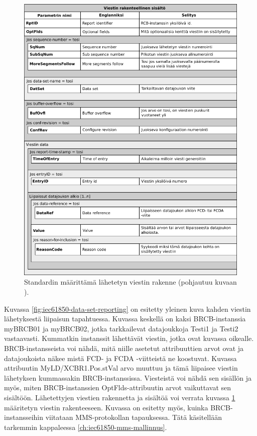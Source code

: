 \begin{figure}[ht!]
	\includegraphics[width=1\textwidth]{pictures/iec61850-report-format.png}
	\caption{Standardin määrittämä lähetetyn viestin rakenne (pohjautuu kuvaan \mbox{\cite[s.~104]{IEC61850-7-2}}).}
	\label{fig:iec61850-report-format}
\end{figure}

Kuvassa \ref{fig:iec61850-data-set-reporting} on esitetty yleinen kuva kahden viestin lähetyksestä liipaisun tapahtuessa. Kuvassa keskellä on kaksi BRCB-instanssia myBRCB01 ja myBRCB02, jotka tarkkailevat datajoukkoja Testi1 ja Testi2 vastaavasti. Kummatkin instanssit lähettävät viestin, jotka ovat kuvassa oikealle. BRCB-instansseista voi nähdä, mitä niille asetetut attribuuttien arvot ovat ja datajoukoista näkee mistä FCD- ja FCDA -viitteistä ne koostuvat. Kuvassa attribuutin MyLD/XCBR1.Pos.stVal arvo muuttuu ja tämä liipaisee viestin lähetyksen kummassakin BRCB-instanssissa. Viesteistä voi nähdä sen sisällön ja myös, miten BRCB-instanssien OptFlds-attribuutin arvot vaikuttavat sen sisältöön. Lähetettyjen viestien rakennetta ja sisältöä voi verrata kuvassa \ref{fig:iec61850-report-format} määritetyn viestin rakenteeseen. Kuvassa on esitetty myös, kuinka BRCB-instansseihin viitataan MMS-protokollan tapauksessa. Tätä käsitellään tarkemmin kappaleessa \ref{ch:iec61850-mms-mallinnus}.

